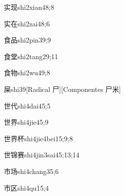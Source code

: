 \begin{verbete}{实现}{shi2xian4}{8;8}
\end{verbete}

\begin{verbete}{实在}{shi2zai4}{8;6}
\end{verbete}

\begin{verbete}{食品}{shi2pin3}{9;9}
\end{verbete}

\begin{verbete}{食堂}{shi2tang2}{9;11}
\end{verbete}

\begin{verbete}{食物}{shi2wu4}{9;8}
\end{verbete}

\begin{verbete}{屎}{shi3}{9}[Radical 尸][Componentes 尸米]
\end{verbete}

\begin{verbete}{世代}{shi4dai4}{5;5}
\end{verbete}

\begin{verbete}{世界}{shi4jie4}{5;9}
\end{verbete}

\begin{verbete}{世界杯}{shi4jie4bei1}{5;9;8}
\end{verbete}

\begin{verbete}{世锦赛}{shi4jin3sai4}{5;13;14}
\end{verbete}

\begin{verbete}{市场}{shi4chang3}{5;6}
\end{verbete}

\begin{verbete}{市区}{shi4qu1}{5;4}
\end{verbete}

